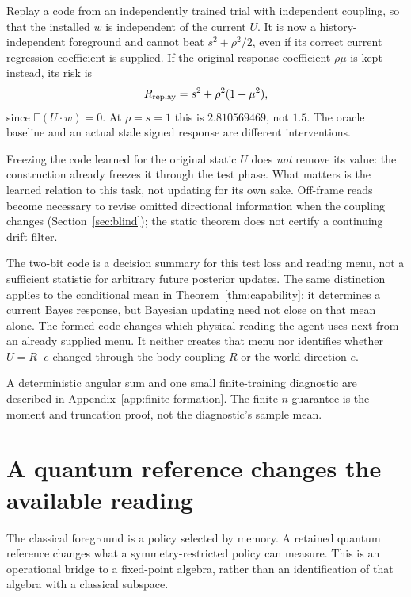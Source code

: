\documentclass[12pt]{article}
\theoremstyle{definition}
\newcommand{\E}{\mathbb E}
\begin{document}
Replay a code from an independently trained trial with independent
coupling, so that the installed $w$ is independent of the current $U$.
It is now a history-independent foreground and cannot beat
$s^2+\rho^2/2$, even if its correct current regression coefficient
is supplied. If the original response coefficient $\rho\mu$ is kept
instead, its risk is
\begin{equation}
 R_{\rm replay}=s^2+\rho^2(1+\mu^2),
 \label{eq:frame-replay}
\end{equation}
since $\E(U\cdot w)=0$. At $\rho=s=1$ this is $2.810569469$,
not $1.5$. The oracle baseline and an actual stale signed response
are different interventions.

Freezing the code learned for the original static $U$ does
\emph{not} remove its value: the construction already freezes it
through the test phase. What matters is the learned relation to
this task, not updating for its own sake.
Off-frame reads become necessary to revise omitted directional
information when the coupling changes
(Section~\ref{sec:blind}); the static theorem does not certify a
continuing drift filter.

The two-bit code is a decision summary for this test loss and reading
menu, not a sufficient statistic for arbitrary future posterior
updates. The same distinction applies to the conditional mean in
Theorem~\ref{thm:capability}: it determines a current Bayes response,
but Bayesian updating need not close on that mean alone.
The formed code changes which physical reading the agent uses next
from an already supplied menu. It neither creates that menu nor
identifies whether $U=R^\top e$ changed through the body coupling
$R$ or the world direction $e$.

A deterministic angular sum and one small finite-training diagnostic
are described in Appendix~\ref{app:finite-formation}.
The finite-$n$ guarantee is the moment and truncation proof, not the
diagnostic's sample mean.


\section{A quantum reference changes the available reading}
\label{sec:quantum-frame}

The classical foreground is a policy selected by memory. A retained quantum
reference changes what a symmetry-restricted policy can measure. This is an
operational bridge to a fixed-point algebra, rather than an identification
of that algebra with a classical subspace.
\end{document}
